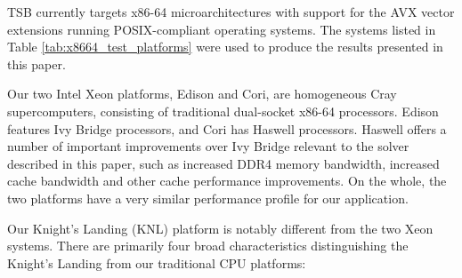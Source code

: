 \documentclass{sig-alternate-05-2015}
\begin{document}
TSB currently targets x86-64 microarchitectures with support for the AVX vector
extensions running POSIX-compliant operating systems. The systems listed in
Table \ref{tab:x8664_test_platforms} were used to produce the results presented in
this paper.

Our two Intel Xeon platforms, Edison and Cori, are homogeneous Cray
supercomputers, consisting of traditional dual-socket x86-64 processors. Edison
features Ivy Bridge processors, and Cori has Haswell processors. Haswell offers
a number of important improvements over Ivy Bridge relevant to the solver described
in this paper, such as increased DDR4 memory bandwidth, increased cache bandwidth
and other cache performance improvements. On the whole, the two platforms have
a very similar performance profile for our application.

Our Knight's Landing (KNL) platform is notably different from the two Xeon systems.
There are primarily four broad characteristics distinguishing the Knight's
Landing from our traditional CPU platforms:
\end{document}
